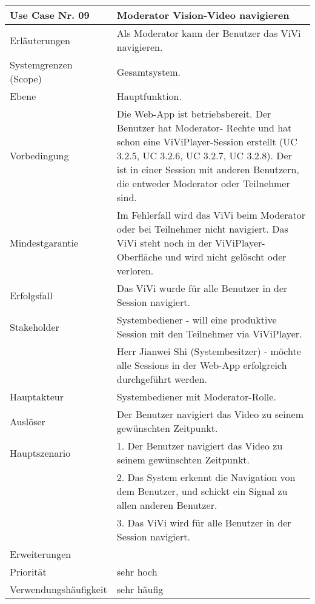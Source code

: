 \begin{tabularx}{\linewidth}{|l|X|}
	\hline
	Use Case Nr. 09			& \textbf{Moderator Vision-Video navigieren} \\ \hline
	Erläuterungen			& Als Moderator kann der Benutzer das ViVi navigieren. \\ \hline
	Systemgrenzen (Scope)	& Gesamtsystem. \\ \hline
	Ebene					& Hauptfunktion. \\ \hline
	Vorbedingung			& Die Web-App ist betriebsbereit. Der Benutzer hat Moderator-
							  Rechte und hat schon eine ViViPlayer-Session erstellt (UC 3.2.5, UC 3.2.6, UC 3.2.7, UC 3.2.8). Der ist in einer Session mit anderen Benutzern, die entweder Moderator oder Teilnehmer sind. \\ \hline
	Mindestgarantie			& Im Fehlerfall wird das ViVi beim Moderator oder bei Teilnehmer 
							  nicht navigiert. Das ViVi steht noch in der ViViPlayer-Oberfläche 
							  und wird nicht gelöscht oder verloren. \\ \hline
	Erfolgsfall 			& Das ViVi wurde für alle Benutzer in der Session navigiert. 
							  \\ \hline
	Stakeholder				& Systembediener - will eine produktive Session mit den Teilnehmer 
							  via ViViPlayer. \\
							& Herr Jianwei Shi (Systembesitzer) - möchte alle Sessions in der 
							  Web-App erfolgreich durchgeführt werden. \\ \hline
	Hauptakteur				& Systembediener mit Moderator-Rolle. \\ \hline
	Auslöser				& Der Benutzer navigiert das Video zu seinem gewünschten 
							  Zeitpunkt. \\ \hline	
	Hauptszenario			& 1. Der Benutzer navigiert das Video zu seinem gewünschten 
							  Zeitpunkt. \\
							& 2. Das System erkennt die Navigation von dem Benutzer, und 
							  schickt ein Signal zu allen anderen Benutzer. \\ 
							& 3. Das ViVi wird für alle Benutzer in der Session navigiert. 
							  \\ \hline
	Erweiterungen			&  \\ \hline
	Priorität				& sehr hoch \\ \hline
	Verwendungshäufigkeit	& sehr häufig \\ \hline
\end{tabularx}